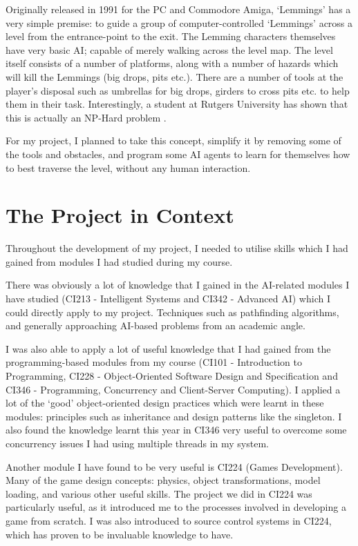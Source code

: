 \documentclass[a4paper,oneside]{report}
\begin{document}
Originally released in 1991 for the PC and Commodore Amiga, `Lemmings' has a very simple premise: to guide a group of computer-controlled `Lemmings' across a level from the entrance-point to the exit. The Lemming characters themselves have very basic AI; capable of merely walking across the level map. The level itself consists of a number of platforms, along with a number of hazards which will kill the Lemmings (big drops, pits etc.). There are a number of tools at the player's disposal such as umbrellas for big drops, girders to cross pits etc. to help them in their task. Interestingly, a student at Rutgers University has shown that this is actually an NP-Hard problem \cite{Cormode:fk}.

For my project, I planned to take this concept, simplify it by removing some of the tools and obstacles, and program some AI agents to learn for themselves how to best traverse the level, without any human interaction.
		
\section{The Project in Context}
	
Throughout the development of my project, I needed to utilise skills which I had gained from modules I had studied during my course.

There was obviously a lot of knowledge that I gained in the AI-related modules I have studied (CI213 - Intelligent Systems and CI342 - Advanced AI) which I could directly apply to my project. Techniques such as pathfinding algorithms, and generally approaching AI-based problems from an academic angle.

I was also able to apply a lot of useful knowledge that I had gained from the programming-based modules from my course (CI101 - Introduction to Programming, CI228 - Object-Oriented Software Design and Specification and CI346 - Programming, Concurrency and Client-Server Computing). I applied a lot of the `good' object-oriented design practices which were learnt in these modules: principles such as inheritance and design patterns like the singleton. I also found the knowledge learnt this year in CI346 very useful to overcome some concurrency issues I had using multiple threads in my system.

Another module I have found to be very useful is CI224 (Games Development). Many of the game design concepts: physics, object transformations, model loading, and various other useful skills. The project we did in CI224 was particularly useful, as it introduced me to the processes involved in developing a game from scratch. I was also introduced to source control systems in CI224, which has proven to be invaluable knowledge to have.
\end{document}
